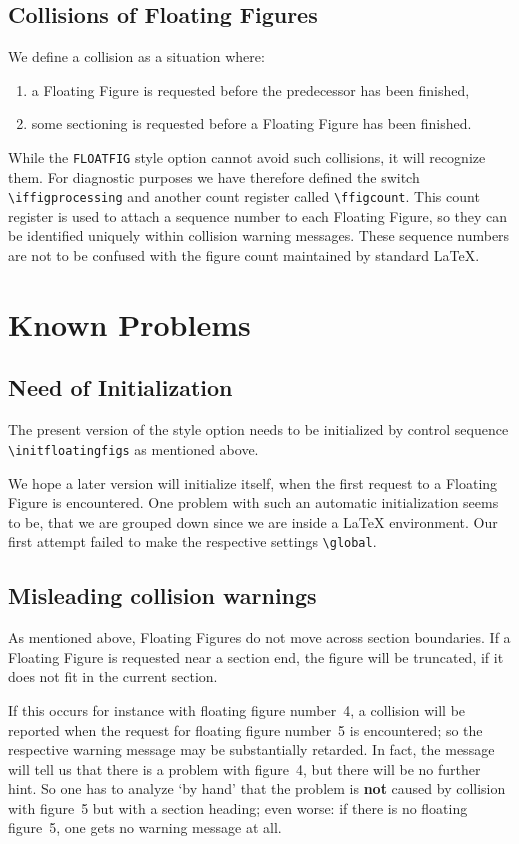  \subsection{Collisions of Floating Figures}
 We define a collision as a situation where:
 \begin{enumerate}
 \item a Floating Figure is requested before the predecessor
       has been finished,
 \item some sectioning is requested before a Floating Figure has been
       finished.
 \end{enumerate}
  
 While the {\tt FLOATFIG} style option cannot avoid such collisions,
 it will recognize them.
 For diagnostic purposes we have therefore defined 
 the switch \verb+\iffigprocessing+ and another count register called
 \verb+\ffigcount+.
 This count register is used to attach 
 a sequence number to each Floating Figure,
 so they can be identified uniquely within collision warning messages. 
 These sequence numbers are not to be confused 
 with the figure count maintained by standard \LaTeX.
 \section{Known Problems}
 \subsection{Need of Initialization}
 The present version of the style option needs to be initialized
 by control sequence 
 {\tt\verb+\initfloatingfigs+} as mentioned above.
  
 We hope a later version will initialize itself, 
 when the first request to a Floating Figure is encountered. 
 One problem with such an automatic initialization seems 
 to be, 
 that we are grouped down
 since we are inside a \LaTeX{} environment.
 Our first attempt failed 
 to make the respective settings \verb+\global+.
 \subsection{Misleading collision warnings}
 As mentioned above, Floating Figures do not move across section boundaries.
 If a Floating Figure is requested near a section end, 
 the figure will be truncated, 
 if it does not fit in the current section.
  
 If this occurs for instance with floating figure number~4,  
 a collision will be reported when the request for
 floating figure number~5 is encountered;
 so the respective warning message may be substantially retarded.
 In fact, the message will tell us that there is a problem with figure~4, 
 but there will be no further hint.
 So one has to analyze `by hand' that the problem is {\bf not} caused
 by collision with figure~5 but with a section heading;
 even worse: if there is no floating figure~5, one gets no warning message
 at all. 
  
